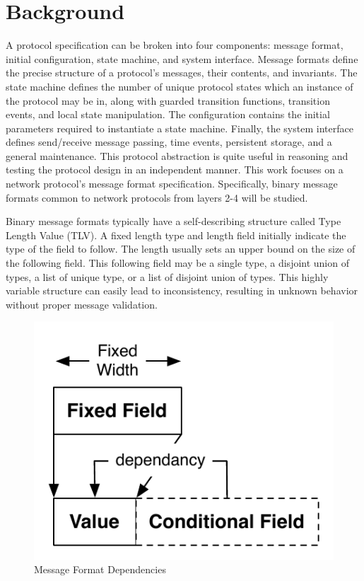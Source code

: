 \section{Background}
     
A protocol specification can be broken into four components: message format,
initial configuration, state machine, and system interface. Message formats
define the precise structure of a protocol's messages, their contents, and
invariants. The state machine defines the number of unique protocol states 
which an instance of the protocol may be in, along with guarded transition
functions, transition events, and local state manipulation. The configuration
contains the initial parameters required to instantiate a state machine.
Finally, the system interface defines send/receive message passing, time events,
persistent storage, and a general maintenance. This protocol abstraction is
quite useful in reasoning and testing the protocol design in an independent
manner. This work focuses on a network protocol's message format specification.
Specifically, binary message formats common to network protocols from layers 2-4
will be studied.

Binary message formats typically have a self-describing structure called Type
Length Value (TLV). A fixed length type and length field initially indicate the
type of the field to follow. The length usually sets an upper bound on the size
of the following field. This following field may be a single type, a disjoint
union of types, a list of unique type, or a list of disjoint union of types.
This highly variable structure can easily lead to inconsistency, resulting in
unknown behavior without proper message validation. 

\begin{figure}[h]
   \begin{center}
   \includegraphics[width=.40\textwidth]{figs/fig1.pdf}
   \caption{Message Format Dependencies}
   \label{figure:fig1}
   \end{center}
\end{figure}

